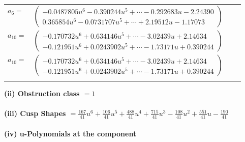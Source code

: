 \documentclass[1p]{elsarticle_modified}
\theoremstyle{definition}
\begin{document}
\begin{tabular}{m{7pt} m{180pt} m{7pt} m{180pt} }
\flushright $a_{6}=$&$\begin{pmatrix}-0.0487805 u^{6}-0.390244 u^{5}+\cdots-0.292683 u-2.24390\\0.365854 u^{6}-0.0731707 u^{5}+\cdots+2.19512 u-1.17073\end{pmatrix}$ \\
\flushright $a_{10}=$&$\begin{pmatrix}-0.170732 u^{6}+0.634146 u^{5}+\cdots-3.02439 u+2.14634\\-0.121951 u^{6}+0.0243902 u^{5}+\cdots-1.73171 u+0.390244\end{pmatrix}$\\ \flushright $a_{10}=$&$\begin{pmatrix}-0.170732 u^{6}+0.634146 u^{5}+\cdots-3.02439 u+2.14634\\-0.121951 u^{6}+0.0243902 u^{5}+\cdots-1.73171 u+0.390244\end{pmatrix}$\\&\end{tabular}
\flushleft \textbf{(ii) Obstruction class $= 1$}\\~\\
\flushleft \textbf{(iii) Cusp Shapes $= \frac{167}{41} u^6+\frac{106}{41} u^5+\frac{488}{41} u^4+\frac{715}{41} u^3-\frac{108}{41} u^2+\frac{551}{41} u-\frac{190}{41}$}\\~\\
\newpage\renewcommand{\arraystretch}{1}
\flushleft \textbf{(iv) u-Polynomials at the component}\newline \\
\end{document}
